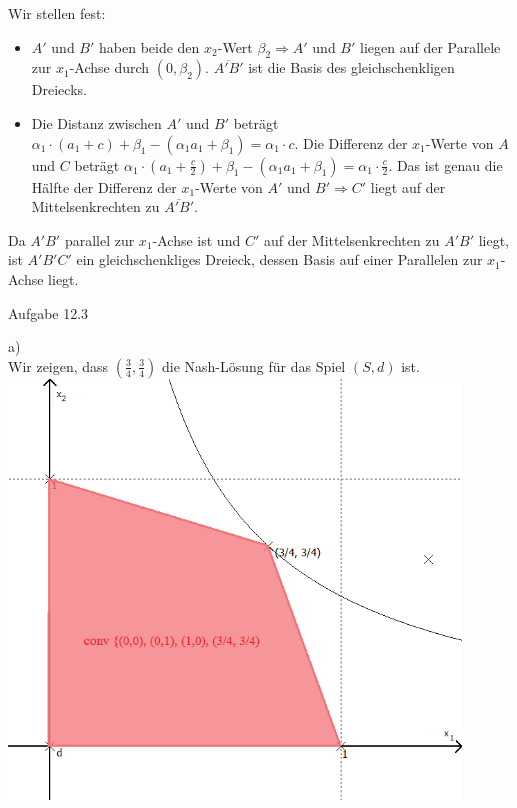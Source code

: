 \documentclass{scrartcl}
\begin{document}
Wir stellen fest: \\

\begin{itemize}
\item{$A'$ und $B'$ haben beide den $x_2$-Wert $\beta_2 \Rightarrow A'$ und $B'$ liegen auf der Parallele
zur $x_1$-Achse durch $(0, \beta_2)$. $\overline{A'B'}$ ist die Basis des gleichschenkligen Dreiecks.}
\item{Die Distanz zwischen $A'$ und $B'$ beträgt $\alpha_1 \cdot (a_1 + c) + \beta_1 - (\alpha_1 a_1 +
\beta_1) = \alpha_1 \cdot c$. Die Differenz der $x_1$-Werte von $A$ und $C$ beträgt $\alpha_1 \cdot (a_1 +
\frac{c}{2}) + \beta_1 - (\alpha_1 a_1 + \beta_1) = \alpha_1 \cdot \frac{c}{2}$. Das ist genau
die Hälfte der Differenz der $x_1$-Werte von $A'$ und $B' \Rightarrow C'$ liegt auf der Mittelsenkrechten
zu $\overline{A'B'}$.}
\end{itemize}

Da $A'B'$ parallel zur $x_1$-Achse ist und $C'$ auf der Mittelsenkrechten zu $A'B'$ liegt, ist $A'B'C'$
ein gleichschenkliges Dreieck, dessen Basis auf einer Parallelen zur $x_1$-Achse liegt. \clearpage

\begin{Large}
Aufgabe 12.3\\[0.0cm]
\end{Large}

a) \\

Wir zeigen, dass $(\frac{3}{4}, \frac{3}{4})$ die Nash-Lösung für das Spiel $(S, d)$ ist. \\

\includegraphics[width=12cm]{3a.png} \\
\end{document}
